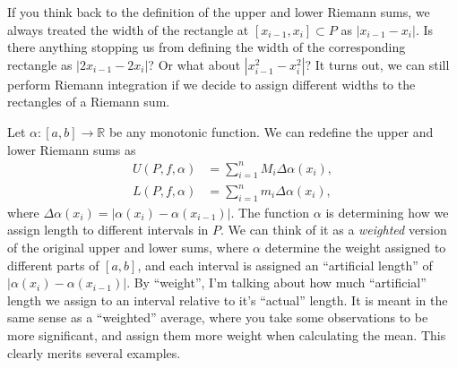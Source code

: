 \documentclass{article}
\newcommand{\R}{\mathbb{R}}
\theoremstyle{definition}
\begin{document}
	If you think back to the definition of the upper and lower Riemann sums, we always treated the width of the rectangle at $ [x_{i-1},x_i]\subset P $ as $ |x_{i-1}-x_i| $. Is there anything stopping us from defining the width of the corresponding rectangle as $ |2x_{i-1}-2x_i| $? Or what about $ |x_{i-1}^2-x_i^2| $?  It turns out, we can still perform Riemann integration if we decide to assign different widths to the rectangles of a Riemann sum. 
	
	Let $ \alpha:[a,b]\to\R $ be any monotonic function. We can redefine the upper and lower Riemann sums as 
	\begin{align*}
		U(P,f,\alpha)&=\sum_{i=1}^{n}M_i\Delta \alpha(x_i),\\
		L(P,f,\alpha)&=\sum_{i=1}^{n}m_i\Delta \alpha(x_i),
	\end{align*} 
	where $\Delta\alpha(x_i)=|\alpha(x_i)-\alpha(x_{i-1})| $. The function $ \alpha $ is determining how we assign length to different intervals in $ P $. We can think of it as a \textit{weighted} version of the original upper and lower sums, where $ \alpha $ determine the weight assigned to different parts of $ [a,b] $, and each interval is assigned an ``artificial length'' of $ |\alpha(x_i)-\alpha(x_{i-1})| $. By ``weight'', I'm talking about how much ``artificial'' length we assign to an interval relative to it's ``actual'' length. It is meant in the same sense as a ``weighted'' average, where you take some observations to be more significant, and assign them more weight when calculating the mean. This clearly merits several examples.
\end{document}
